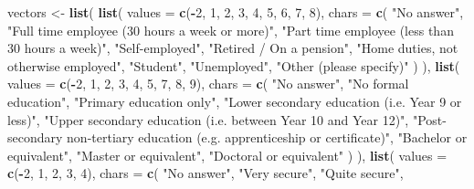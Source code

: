 \documentclass[
]{article}
\newenvironment{Shaded}{\begin{snugshade}}{\end{snugshade}}
\newcommand{\AttributeTok}[1]{\textcolor[rgb]{0.13,0.29,0.53}{#1}}
\newcommand{\DecValTok}[1]{\textcolor[rgb]{0.00,0.00,0.81}{#1}}
\newcommand{\FunctionTok}[1]{\textcolor[rgb]{0.13,0.29,0.53}{\textbf{#1}}}
\newcommand{\NormalTok}[1]{#1}
\newcommand{\OtherTok}[1]{\textcolor[rgb]{0.56,0.35,0.01}{#1}}
\newcommand{\SpecialCharTok}[1]{\textcolor[rgb]{0.81,0.36,0.00}{\textbf{#1}}}
\newcommand{\StringTok}[1]{\textcolor[rgb]{0.31,0.60,0.02}{#1}}
\begin{document}
\begin{Shaded}
\begin{Highlighting}[]
\NormalTok{vectors }\OtherTok{\textless{}{-}} \FunctionTok{list}\NormalTok{(}
  \FunctionTok{list}\NormalTok{(}
    \AttributeTok{values =} \FunctionTok{c}\NormalTok{(}\SpecialCharTok{{-}}\DecValTok{2}\NormalTok{, }\DecValTok{1}\NormalTok{, }\DecValTok{2}\NormalTok{, }\DecValTok{3}\NormalTok{, }\DecValTok{4}\NormalTok{, }\DecValTok{5}\NormalTok{, }\DecValTok{6}\NormalTok{, }\DecValTok{7}\NormalTok{, }\DecValTok{8}\NormalTok{),}
    \AttributeTok{chars =} \FunctionTok{c}\NormalTok{(}
      \StringTok{"No answer"}\NormalTok{, }
      \StringTok{"Full time employee (30 hours a week or more)"}\NormalTok{,  }
      \StringTok{"Part time employee (less than 30 hours a week)"}\NormalTok{, }
      \StringTok{"Self{-}employed"}\NormalTok{,                          }
      \StringTok{"Retired / On a pension"}\NormalTok{,                  }
      \StringTok{"Home duties, not otherwise employed"}\NormalTok{,    }
      \StringTok{"Student"}\NormalTok{,                                 }
      \StringTok{"Unemployed"}\NormalTok{,                             }
      \StringTok{"Other (please specify)"}
\NormalTok{    )}
\NormalTok{  ),}
  \FunctionTok{list}\NormalTok{(}
    \AttributeTok{values =} \FunctionTok{c}\NormalTok{(}\SpecialCharTok{{-}}\DecValTok{2}\NormalTok{, }\DecValTok{1}\NormalTok{, }\DecValTok{2}\NormalTok{, }\DecValTok{3}\NormalTok{, }\DecValTok{4}\NormalTok{, }\DecValTok{5}\NormalTok{, }\DecValTok{7}\NormalTok{, }\DecValTok{8}\NormalTok{, }\DecValTok{9}\NormalTok{),}
    \AttributeTok{chars =} \FunctionTok{c}\NormalTok{(}
      \StringTok{"No answer"}\NormalTok{,}
      \StringTok{"No formal education"}\NormalTok{,}
      \StringTok{"Primary education only"}\NormalTok{,}
      \StringTok{"Lower secondary education (i.e. Year 9 or less)"}\NormalTok{,}
      \StringTok{"Upper secondary education (i.e. between Year 10 and Year 12)"}\NormalTok{,}
      \StringTok{"Post{-}secondary non{-}tertiary education (e.g. apprenticeship or certificate)"}\NormalTok{,}
      \StringTok{"Bachelor or equivalent"}\NormalTok{,}
      \StringTok{"Master or equivalent"}\NormalTok{,}
      \StringTok{"Doctoral or equivalent"}
\NormalTok{    )}
\NormalTok{  ),}
  \FunctionTok{list}\NormalTok{(}
    \AttributeTok{values =} \FunctionTok{c}\NormalTok{(}\SpecialCharTok{{-}}\DecValTok{2}\NormalTok{, }\DecValTok{1}\NormalTok{, }\DecValTok{2}\NormalTok{, }\DecValTok{3}\NormalTok{, }\DecValTok{4}\NormalTok{),}
    \AttributeTok{chars =} \FunctionTok{c}\NormalTok{(}
      \StringTok{"No answer"}\NormalTok{,}
      \StringTok{"Very secure"}\NormalTok{,}
      \StringTok{"Quite secure"}\NormalTok{,}

\end{Highlighting}
\end{Shaded}
\end{document}
